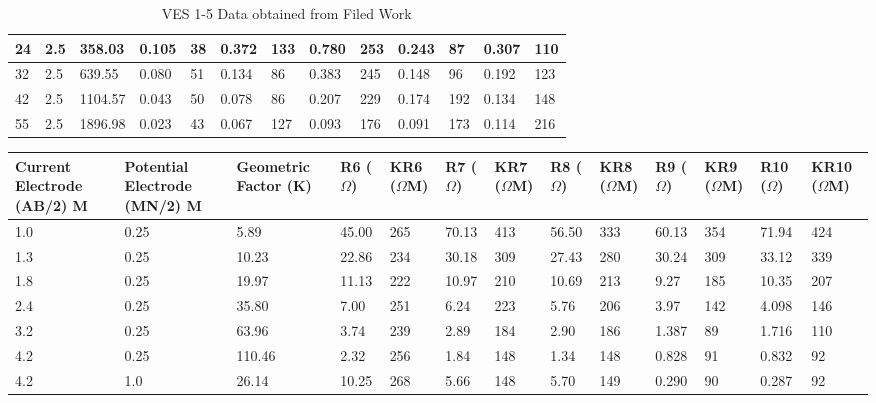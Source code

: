\documentclass[12pt,a4paper]{report}
\begin{document}
\begin{table}[h!]
\begin{adjustbox}{max width=\textwidth}
\begin{tabular}{|p{2.5cm}|p{2.5cm}|p{2.5cm}|p{1.5cm}|p{1.8cm}|p{1.5cm}|p{1.8cm}|p{1.5cm}|p{1.8cm}|p{1.5cm}|p{1.8cm}|p{1.5cm}|p{1.8cm}|}
    24 & 2.5 & 358.03 & 0.105 & 38 & 0.372 & 133 & 0.780 & 253 & 0.243 & 87 & 0.307 & 110 \\ \hline
    32 & 2.5 & 639.55 & 0.080 & 51 & 0.134 & 86 & 0.383 & 245 & 0.148 & 96 & 0.192 & 123 \\ \hline
    42 & 2.5 & 1104.57 & 0.043 & 50 & 0.078 & 86 & 0.207 & 229 & 0.174 & 192 & 0.134 & 148 \\ \hline
    55 & 2.5 & 1896.98 & 0.023 & 43 & 0.067 & 127 & 0.093 & 176 & 0.091 & 173 & 0.114 & 216 \\ \hline
    \end{tabular}
    \end{adjustbox}
    \caption{VES 1-5 Data obtained from Filed Work}
    \label{tab:ui_ves-1-5}
\end{table}

\begin{table}[h!]
    \centering
    \begin{adjustbox}{max width=\textwidth}
    \renewcommand{\arraystretch}{1.5}
    \begin{tabular}{|p{2.5cm}|p{2.5cm}|p{2.5cm}|p{1.5cm}|p{1.8cm}|p{1.5cm}|p{1.8cm}|p{1.5cm}|p{1.8cm}|p{1.5cm}|p{1.8cm}|p{1.5cm}|p{1.8cm}|}
    \hline
    \textbf{Current Electrode (AB/2) M} & 
    \textbf{Potential Electrode (MN/2) M} & 
    \textbf{Geometric Factor (K)} & 
    \textbf{R6 ($\Omega$)} & 
    \textbf{KR6 ($\Omega$M)} & 
    \textbf{R7 ($\Omega$)} & 
    \textbf{KR7 ($\Omega$M)} & 
    \textbf{R8 ($\Omega$)} & 
    \textbf{KR8 ($\Omega$M)} & 
    \textbf{R9 ($\Omega$)} & 
    \textbf{KR9 ($\Omega$M)} & 
    \textbf{R10 ($\Omega$)} & 
    \textbf{KR10 ($\Omega$M)} \\ 
    \hline
    1.0 & 0.25 & 5.89 & 45.00 & 265 & 70.13 & 413 & 56.50 & 333 & 60.13 & 354 & 71.94 & 424 \\ \hline
    1.3 & 0.25 & 10.23 & 22.86 & 234 & 30.18 & 309 & 27.43 & 280 & 30.24 & 309 & 33.12 & 339 \\ \hline
    1.8 & 0.25 & 19.97 & 11.13 & 222 & 10.97 & 210 & 10.69 & 213 & 9.27 & 185 & 10.35 & 207 \\ \hline
    2.4 & 0.25 & 35.80 & 7.00 & 251 & 6.24 & 223 & 5.76 & 206 & 3.97 & 142 & 4.098 & 146 \\ \hline
    3.2 & 0.25 & 63.96 & 3.74 & 239 & 2.89 & 184 & 2.90 & 186 & 1.387 & 89 & 1.716 & 110 \\ \hline
    4.2 & 0.25 & 110.46 & 2.32 & 256 & 1.84 & 148 & 1.34 & 148 & 0.828 & 91 & 0.832 & 92 \\ \hline
    4.2 & 1.0 & 26.14 & 10.25 & 268 & 5.66 & 148 & 5.70 & 149 & 0.290 & 90 & 0.287 & 92 \\ \hline

\end{tabular}
\end{adjustbox}
\end{table}
\end{document}
